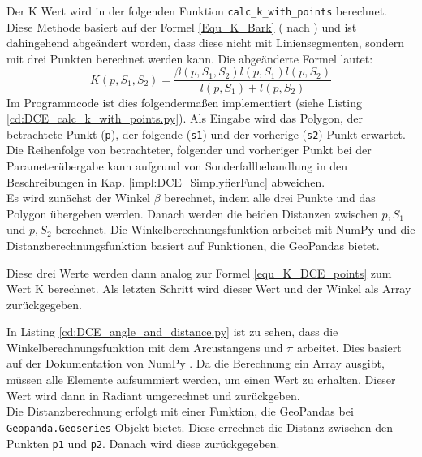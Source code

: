 {	Der K Wert wird in der folgenden Funktion \lstinline|calc_k_with_points| berechnet. Diese Methode basiert auf der Formel \ref{Equ_K_Bark} ( nach \citet{Latecki1999a}) und ist dahingehend abgeändert worden, dass diese nicht mit Liniensegmenten, sondern mit drei Punkten berechnet werden kann. Die abgeänderte Formel lautet:
	\begin{equation}
		K(p,S_1,S_2) = \frac{\beta(p, S_1, S_2)l(p, S_1)l(p, S_2)}{l(p, S_1) + l(p, S_2)} 
		\label{equ_K_DCE_points}
	\end{equation}
	Im Programmcode ist dies folgendermaßen implementiert (siehe Listing \ref{cd:DCE_calc_k_with_points.py}). Als Eingabe wird das Polygon, der betrachtete Punkt (\lstinline|p|), der folgende (\lstinline|s1|) und der vorherige (\lstinline|s2|) Punkt erwartet. Die Reihenfolge von betrachteter, folgender und vorheriger Punkt bei der Parameterübergabe kann aufgrund von Sonderfallbehandlung in den Beschreibungen in Kap. \ref{impl:DCE_SimplyfierFunc} abweichen. \\ 
	Es wird zunächst der Winkel $\beta$ berechnet, indem alle drei Punkte und das Polygon übergeben werden. Danach werden die beiden Distanzen zwischen $p, S_1$ und $p, S_2$ berechnet. Die Winkelberechnungsfunktion arbeitet mit NumPy und die Distanzberechnungsfunktion basiert auf Funktionen, die GeoPandas bietet.
	
	Diese drei Werte werden dann analog zur Formel \ref{equ_K_DCE_points} zum Wert K berechnet. Als letzten Schritt wird dieser Wert und der Winkel als Array zurückgegeben.
	
	In Listing \ref{cd:DCE_angle_and_distance.py} ist zu sehen, dass die Winkelberechnungsfunktion mit dem Arcustangens und $\pi$ arbeitet. Dies basiert auf der Dokumentation von NumPy \citep{numpy_angle}. Da die Berechnung ein Array ausgibt, müssen alle Elemente aufsummiert werden, um einen Wert zu erhalten. Dieser Wert wird dann in Radiant umgerechnet und zurückgeben. \\
	Die Distanzberechnung erfolgt mit einer Funktion, die GeoPandas bei \lstinline|Geopanda.Geoseries| Objekt bietet. Diese errechnet die Distanz zwischen den Punkten \lstinline|p1| und \lstinline|p2|. Danach wird diese zurückgegeben.

	

}
